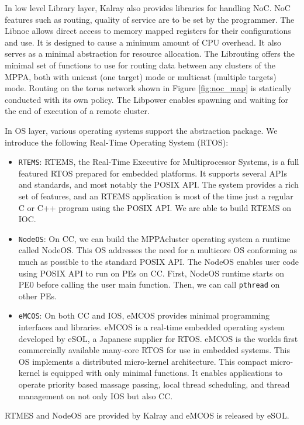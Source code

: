 \documentclass{sig-alternate-05-2015}
\begin{document}
In low level Library layer, Kalray also provides libraries for handling NoC.
NoC features such as routing, quality of service are to be set by the programmer.
The Libnoc allows direct access to memory mapped registers for their configurations and use.
It is designed to cause a minimum amount of CPU overhead.
It also serves as a minimal abstraction for resource allocation.
The Librouting offers the minimal set of functions to use for routing data between any clusters of the MPPA,
both with unicast (one target) mode or multicast (multiple targets) mode.
Routing on the torus network shown in Figure \ref{fig:noc_map} is statically conducted with its own policy.
The Libpower enables spawning and waiting for the end of execution of a remote cluster.

In OS layer, various operating systems support the abstraction package.
We introduce the following Real-Time Operating System (RTOS):
\begin{itemize}
\item \verb+RTEMS+: RTEMS, the Real-Time Executive for Multiprocessor Systems, is a full featured RTOS prepared for embedded platforms.
It supports several APIs and standards, and most notably the POSIX API.
The system provides a rich set of features, and an RTEMS application is most of the time just a regular C or C++ program using the POSIX API.
We are able to build RTEMS on IOC.
\item \verb+NodeOS+: On CC, we can build the MPPAcluster operating system a runtime called NodeOS.
This OS addresses the need for a multicore OS conforming as much as possible to the standard POSIX API.
The NodeOS enables user code using POSIX API to run on PEs on CC.
First, NodeOS runtime starts on PE0 before calling the user main function.
Then, we can call \texttt{pthread} on other PEs.
\item \verb+eMCOS+: On both CC and IOS, eMCOS provides minimal programming interfaces and libraries.
eMCOS is a real-time embedded operating system developed by eSOL, a Japanese supplier for RTOS.
eMCOS is the worlds first commercially available many-core RTOS for use in embedded systems.
This OS implements a distributed micro-kernel architecture.
This compact micro-kernel is equipped with only minimal functions.
It enables applications to operate priority based massage passing, local thread scheduling, and thread management on not only IOS but also CC.
\end{itemize}
RTMES and NodeOS are provided by Kalray and eMCOS is released by eSOL.
\end{document}
